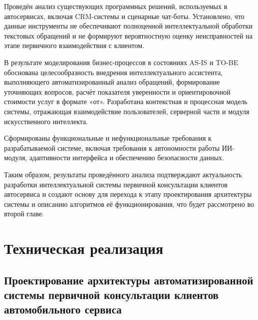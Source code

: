 \documentclass[14pt,a4paper]{extarticle}
\numberwithin{figure}{section}
\numberwithin{table}{section}
\begin{document}
Проведён анализ существующих программных решений, используемых в
автосервисах, включая CRM-системы и сценарные чат-боты. Установлено, что
данные инструменты не обеспечивают полноценной интеллектуальной
обработки текстовых обращений и не формируют вероятностную оценку
неисправностей на этапе первичного взаимодействия с клиентом.

В результате моделирования бизнес-процессов в состояниях AS-IS и TO-BE
обоснована целесообразность внедрения интеллектуального ассистента,
выполняющего автоматизированный анализ обращений, формирование
уточняющих вопросов, расчёт показателя уверенности и ориентировочной
стоимости услуг в формате «от». Разработана контекстная и процессная
модель системы, отражающая взаимодействие пользователей, серверной части
и модуля искусственного интеллекта.

Сформированы функциональные и нефункциональные требования к
разрабатываемой системе, включая требования к автономности работы
ИИ-модуля, адаптивности интерфейса и обеспечению безопасности данных.

Таким образом, результаты проведённого анализа подтверждают актуальность
разработки интеллектуальной системы первичной консультации клиентов
автосервиса и создают основу для перехода к этапу проектирования
архитектуры системы и описанию алгоритмов её функционирования, что будет
рассмотрено во второй главе.

\section{\texorpdfstring{\hfill\break
Техническая
реализация}{ Техническая реализация}}\label{ux442ux435ux445ux43dux438ux447ux435ux441ux43aux430ux44f-ux440ux435ux430ux43bux438ux437ux430ux446ux438ux44f}

\subsection{Проектирование архитектуры автоматизированной системы
первичной консультации клиентов автомобильного
сервиса}\label{ux43fux440ux43eux435ux43aux442ux438ux440ux43eux432ux430ux43dux438ux435-ux430ux440ux445ux438ux442ux435ux43aux442ux443ux440ux44b-ux430ux432ux442ux43eux43cux430ux442ux438ux437ux438ux440ux43eux432ux430ux43dux43dux43eux439-ux441ux438ux441ux442ux435ux43cux44b-ux43fux435ux440ux432ux438ux447ux43dux43eux439-ux43aux43eux43dux441ux443ux43bux44cux442ux430ux446ux438ux438-ux43aux43bux438ux435ux43dux442ux43eux432-ux430ux432ux442ux43eux43cux43eux431ux438ux43bux44cux43dux43eux433ux43e-ux441ux435ux440ux432ux438ux441ux430}
\end{document}

